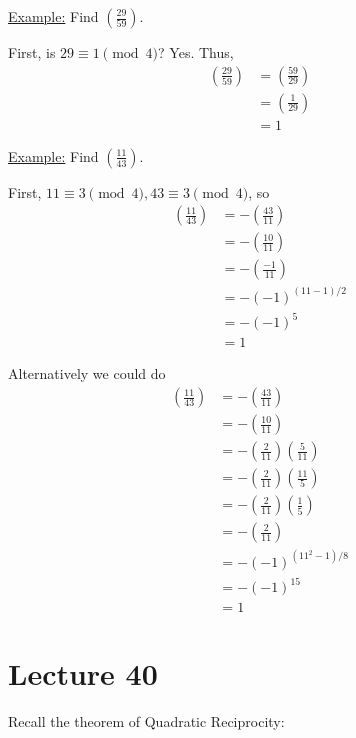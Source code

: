 \documentclass{article}
\begin{document}
\underline{Example:} Find $(\frac{29}{59})$. 

First, is $29\equiv 1\pmod 4$? Yes. Thus, \begin{align*}
    (\frac{29}{59})&=(\frac{59}{29})\\
    &=(\frac{1}{29})\\
    &=1
\end{align*}

\underline{Example:} Find $(\frac{11}{43})$. 

First, $11\equiv 3\pmod 4, 43\equiv 3\pmod 4$, so \begin{align*}
    (\frac{11}{43})&=-(\frac{43}{11})\\
    &=- (\frac{10}{11})\\
    &=- (\frac{-1}{11})\\
    &=- (-1)^{(11-1)/2}\\
    &=- (-1)^5\\
    &=1
\end{align*}

Alternatively we could do \begin{align*}
    (\frac{11}{43})&=-(\frac{43}{11})\\
    &=- (\frac{10}{11})\\
    &=- (\frac{2}{11})(\frac{5}{11})\\
    &=- (\frac{2}{11})(\frac{11}{5})\\
    &=- (\frac{2}{11})(\frac{1}{5})\\
    &=- (\frac{2}{11})\\
    &=- (-1)^{(11^2-1)/8}\\
    &=- (-1)^{15}\\
    &=1
\end{align*}

\section{Lecture 40}

Recall the theorem of Quadratic Reciprocity:
\end{document}
